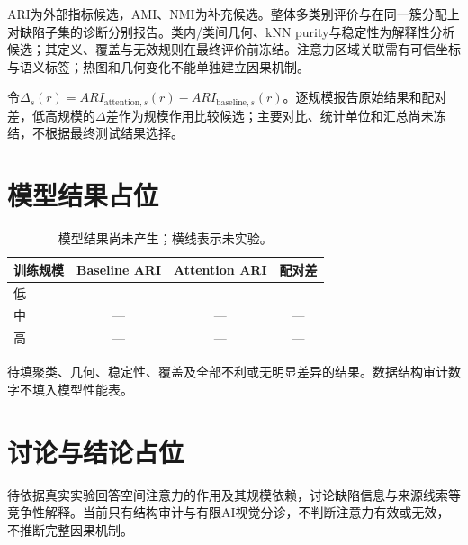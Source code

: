 \documentclass[11pt,a4paper]{article}
\begin{document}
ARI为外部指标候选，AMI、NMI为补充候选\cite{vinh2010information}。整体多类别评价与在同一簇分配上对缺陷子集的诊断分别报告。类内/类间几何、kNN purity与稳定性为解释性分析候选；其定义、覆盖与无效规则在最终评价前冻结。注意力区域关联需有可信坐标与语义标签；热图和几何变化不能单独建立因果机制。

令$\Delta_s(r)=ARI_{\mathrm{attention},s}(r)-ARI_{\mathrm{baseline},s}(r)$。逐规模报告原始结果和配对差，低高规模的$\Delta$差作为规模作用比较候选；主要对比、统计单位和汇总尚未冻结，不根据最终测试结果选择。

\section{模型结果占位}
\begin{table}[ht]\centering
\caption{模型结果尚未产生；横线表示未实验。}
\begin{tabular}{lccc}\toprule
训练规模&Baseline ARI&Attention ARI&配对差\\\midrule
低&---&---&---\\中&---&---&---\\高&---&---&---\\\bottomrule
\end{tabular}\end{table}
待填聚类、几何、稳定性、覆盖及全部不利或无明显差异的结果。数据结构审计数字不填入模型性能表。

\section{讨论与结论占位}
待依据真实实验回答空间注意力的作用及其规模依赖，讨论缺陷信息与来源线索等竞争性解释。当前只有结构审计与有限AI视觉分诊，不判断注意力有效或无效，不推断完整因果机制。

\end{document}

